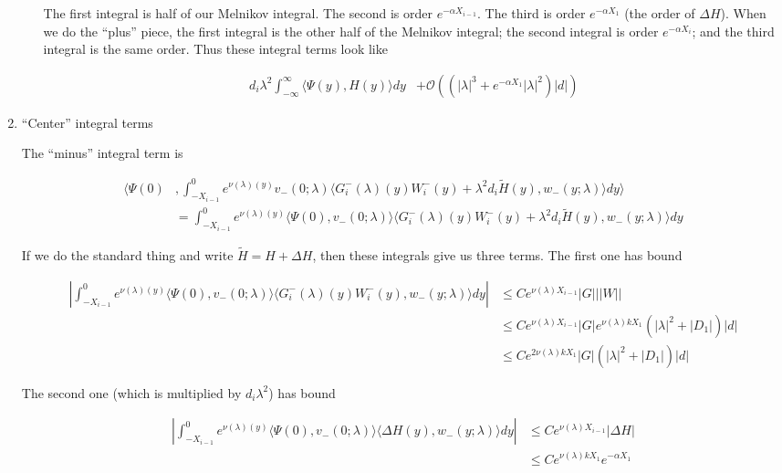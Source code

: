 \documentclass[12pt]{article}
\begin{document}
\begin{enumerate}
\begin{enumerate}[(i)]
The first integral is half of our Melnikov integral. The second is order $e^{-\alpha X_{i-1}}$. The third is order $e^{-\alpha X_1}$ (the order of $\Delta H$). When we do the ``plus'' piece, the first integral is the other half of the Melnikov integral; the second integral is order $e^{-\alpha X_i}$; and the third integral is the same order.
Thus these integral terms look like

\begin{align*}
d_i \lambda^2 \int_{-\infty}^\infty \langle \Psi(y), H(y) \rangle dy &+ \mathcal{O}( ( |\lambda|^3 + e^{-\alpha X_1} |\lambda|^2 )|d|)
\end{align*}

\end{enumerate}

\item ``Center'' integral terms

The ``minus'' integral term is

\begin{align*}
\langle \Psi(0) &, \int_{-X_{i-1}}^0
e^{\nu(\lambda)(y)} v_-(0; \lambda) \langle G_i^-(\lambda)(y)W_i^-(y) + \lambda^2 d_i \tilde{H}(y), w_-(y; \lambda) \rangle dy \rangle \\
&= \int_{-X_{i-1}}^0
e^{\nu(\lambda)(y)} \langle \Psi(0), v_-(0; \lambda) \rangle \langle G_i^-(\lambda)(y)W_i^-(y) + \lambda^2 d_i \tilde{H}(y), w_-(y; \lambda) \rangle dy 
\end{align*}

If we do the standard thing and write $\tilde{H} = H + \Delta H$, then these integrals give us three terms. The first one has bound

\begin{align*}
\left| \int_{-X_{i-1}}^0
e^{\nu(\lambda)(y)} \langle \Psi(0), v_-(0; \lambda) \rangle \langle G_i^-(\lambda)(y)W_i^-(y), w_-(y; \lambda) \rangle dy \right| 
&\leq C e^{\nu(\lambda) X_{i-1}} |G| ||W|| \\
&\leq C e^{\nu(\lambda) X_{i-1}} |G| e^{\nu(\lambda)k X_1} ( |\lambda|^2 + |D_1| )|d| \\
&\leq C e^{2 \nu(\lambda) k X_1} |G| ( |\lambda|^2 + |D_1| )|d|
\end{align*}

The second one (which is multiplied by $d_i \lambda^2$) has bound

\begin{align*}
\left| \int_{-X_{i-1}}^0
e^{\nu(\lambda)(y)} \langle \Psi(0), v_-(0; \lambda) \rangle \langle \Delta H(y), w_-(y; \lambda) \rangle dy \right| 
&\leq C e^{\nu(\lambda)X_{i-1}} |\Delta H| \\
&\leq C e^{\nu(\lambda)k X_1} e^{-\alpha X_1}
\end{align*}


\end{enumerate}
\end{document}

